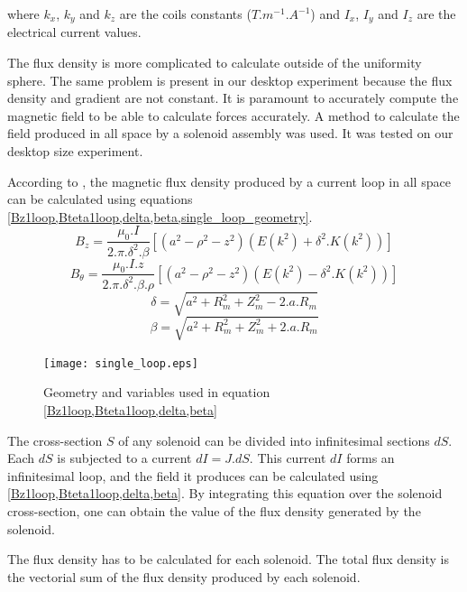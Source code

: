 \documentclass[letterpaper, 10 pt, conference]{ieeeconf}  %
\begin{document}
where $k_x$, $k_y$ and $k_z$ are the coils constants ($T.m^{-1}.A^{-1}$) and $I_x$, $I_y$ and $I_z$ are the electrical current values.\par

The flux density is more complicated to calculate outside of the uniformity sphere. The same problem is present in our desktop experiment because the flux density and gradient are not constant. It is paramount to accurately compute the magnetic field to be able to calculate forces accurately. A method to calculate the field produced in all space by a solenoid assembly was used. It was tested on our desktop size experiment.\par
According to \cite{simpson2001simple}, the magnetic flux density produced by a current loop in all space can be calculated using equations \cref{Bz1loop,Bteta1loop,delta,beta,single_loop_geometry}.
\begin{equation}
B_z=\frac{\mu _0.I}{2.\pi.\delta ^{2}.\beta  }\left [ \left ( a^2-\rho ^2-z^2 \right )(E(k^2)+\delta ^2.K(k^2)) \right ] 
\label{Bz1loop}
\end{equation}
\begin{equation}
B_\theta=\frac{\mu _0.I.z}{2.\pi.\delta ^{2}.\beta.\rho   }\left [ \left ( a^2-\rho ^2-z^2 \right )(E(k^2)-\delta ^2.K(k^2)) \right ]
\label{Bteta1loop}
\end{equation}
\begin{equation}
\delta =\sqrt{a^2+R_m^2+Z_m^2-2.a.R_m}
\label{delta}
\end{equation}
\begin{equation}
\beta =\sqrt{a^2+R_m^2+Z_m^2+2.a.R_m}
\label{beta}
\end{equation}

\begin{figure}
  \texttt{[image: single\_loop.eps]}
  \caption{Geometry and variables used in equation \cref{Bz1loop,Bteta1loop,delta,beta}}
  \label{single_loop_geometry}
\end{figure}

The cross-section $S$ of any solenoid can be divided into infinitesimal sections $dS$. Each $dS$ is subjected to a current $dI=J.dS$. This current $dI$ forms an infinitesimal loop, and the field it produces can be calculated using \cref{Bz1loop,Bteta1loop,delta,beta}. By integrating this equation over the solenoid cross-section, one can obtain the value of the flux density generated by the solenoid.\par
The flux density has to be calculated for each solenoid. The total flux density is the vectorial sum of the flux density produced by each solenoid.
\end{document}
